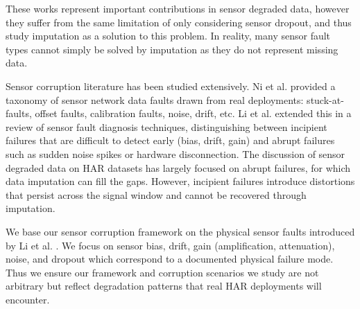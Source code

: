 These works represent important contributions in sensor degraded data, however they suffer from the
same limitation of only considering sensor dropout, and thus study imputation as a solution to this
problem. In reality, many sensor fault types cannot simply be solved by imputation as they do not
represent missing data.

Sensor corruption literature has been studied extensively. Ni et al. \cite{ni-2009} provided
a taxonomy of sensor network data faults drawn from real deployments: stuck-at-faults, offset
faults, calibration faults, noise, drift, etc. Li et al. \cite{li-2020} extended this in a review
of sensor fault diagnosis techniques, distinguishing between incipient failures that are difficult
to detect early (bias, drift, gain) and abrupt failures such as sudden noise spikes or hardware
disconnection. The discussion of sensor degraded data on HAR datasets has largely focused on
abrupt failures, for which data imputation can fill the gaps. However, incipient failures introduce
distortions that persist across the signal window and cannot be recovered through imputation.

We base our sensor corruption framework on the physical sensor faults introduced by Li et al.
\cite{li-2020}. We focus on sensor bias, drift, gain (amplification, attenuation), noise, and
dropout which correspond to a documented physical failure mode. Thus we ensure our framework
and corruption scenarios we study are not arbitrary but reflect degradation patterns that real HAR
deployments will encounter.

%

